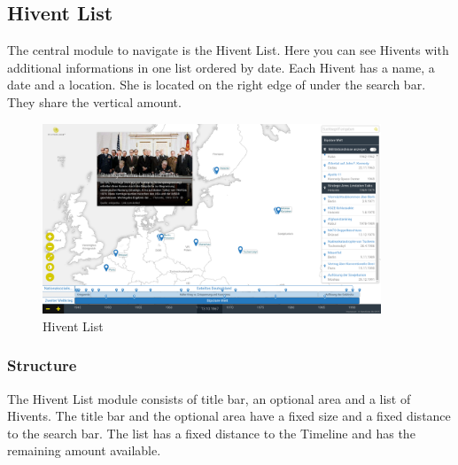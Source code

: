 \subsection{Hivent List} %
\label{sub:hivent_list}

The central module to navigate \HG is the Hivent List. Here you can see Hivents with additional informations in one list ordered by date. Each Hivent has a name, a date and a location. She is located on the right edge of \HG under the search bar. They share the vertical amount.

\begin{figure}[H]
  \centering
  \includegraphics[width=0.9\textwidth]{graphics/final_ui.png}
  \caption{Hivent List}
\end{figure}

\subsubsection{Structure} %
\label{ssub:structure_hl}
The Hivent List module consists of title bar, an optional area and a list of Hivents. The title bar and the optional area have a fixed size and a fixed distance to the search bar. The list has a fixed distance to the Timeline and has the remaining amount available.

